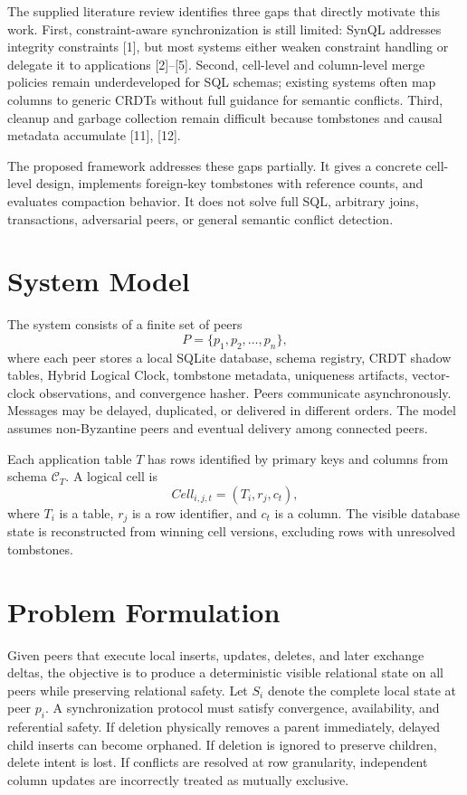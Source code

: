 \documentclass[pdflatex,sn-mathphys-num]{sn-jnl}
\begin{document}
The supplied literature review identifies three gaps that directly motivate this work. First, constraint-aware synchronization is still limited: SynQL addresses integrity constraints [1], but most systems either weaken constraint handling or delegate it to applications [2]--[5]. Second, cell-level and column-level merge policies remain underdeveloped for SQL schemas; existing systems often map columns to generic CRDTs without full guidance for semantic conflicts. Third, cleanup and garbage collection remain difficult because tombstones and causal metadata accumulate [11], [12].

The proposed framework addresses these gaps partially. It gives a concrete cell-level design, implements foreign-key tombstones with reference counts, and evaluates compaction behavior. It does not solve full SQL, arbitrary joins, transactions, adversarial peers, or general semantic conflict detection.

\section{System Model}

The system consists of a finite set of peers
\begin{equation}
P=\{p_1,p_2,\ldots,p_n\},
\label{eq:peers}
\end{equation}
where each peer stores a local SQLite database, schema registry, CRDT shadow tables, Hybrid Logical Clock, tombstone metadata, uniqueness artifacts, vector-clock observations, and convergence hasher. Peers communicate asynchronously. Messages may be delayed, duplicated, or delivered in different orders. The model assumes non-Byzantine peers and eventual delivery among connected peers.

Each application table $T$ has rows identified by primary keys and columns from schema $\mathcal{C}_T$. A logical cell is
\begin{equation}
Cell_{i,j,t}=(T_i,r_j,c_t),
\label{eq:cell-id}
\end{equation}
where $T_i$ is a table, $r_j$ is a row identifier, and $c_t$ is a column. The visible database state is reconstructed from winning cell versions, excluding rows with unresolved tombstones.

\section{Problem Formulation}

Given peers that execute local inserts, updates, deletes, and later exchange deltas, the objective is to produce a deterministic visible relational state on all peers while preserving relational safety. Let $S_i$ denote the complete local state at peer $p_i$. A synchronization protocol must satisfy convergence, availability, and referential safety. If deletion physically removes a parent immediately, delayed child inserts can become orphaned. If deletion is ignored to preserve children, delete intent is lost. If conflicts are resolved at row granularity, independent column updates are incorrectly treated as mutually exclusive.
\end{document}
